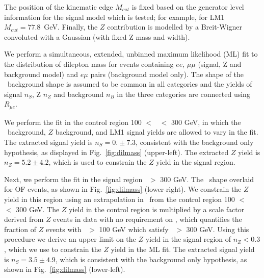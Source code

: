 The position of the kinematic edge $M_{cut}$ is fixed based on the generator level
information for the signal model which is tested; for example, for LM1 
$M_{cut} = 77.8$~GeV. Finally, the $Z$ contribution is modelled by a Breit-Wigner 
convoluted with a Gaussian (with fixed Z mass and width). 

We perform a simultaneous, extended, unbinned maximum 
likelihood (ML) fit to the distribution of dilepton mass for events containing $ee$, $\mu\mu$ 
(signal, Z and background model)
and $e\mu$ pairs (background model only). 
The shape of the \ttbar\ background shape is assumed to be common in all categories
and the yields of signal $n_S$, Z $n_Z$ and background $n_B$ 
in the three categories are connected using $R_{\mu e}$. 

We perform the fit in the control region 100 $<$ \Ht\ $<$ 300 GeV, in
which the \ttbar\ background, $Z$ background, and LM1 signal yields are allowed to vary in the fit. 
The extracted signal yield is $n_S = 0. \pm 7.3$, consistent with the background only 
hypothesis, as displayed in Fig.~\ref{fig:dilmass} (upper-left). 
The extracted $Z$ yield is $n_Z = 5.2 \pm 4.2$, which is 
used to constrain the $Z$ yield in the signal region. 

Next, we perform the fit in the signal region \Ht\ $>$ 300 GeV. The \ttbar\ shape
overlaid for OF events, as shown in Fig.~\ref{fig:dilmass} (lower-right). We
constrain the $Z$ yield in this region using an extrapolation in \Ht\ from the 
control region 100 $<$ \Ht\ $<$ 300 GeV. The $Z$ yield in the control region is
multiplied by a scale factor derived from $Z$ events in data with no requirement
on \MET, which quantifies the fraction of $Z$ events with \Ht\ $>$ 100 GeV which 
satisfy \Ht\ $>$ 300 GeV. Using this procedure we derive an upper limit on the
$Z$ yield in the signal region of $n_Z < 0.3$, which we use to constrain the
$Z$ yield in the ML fit. The extracted signal yield is $n_S = 3.5 \pm 4.9$,
which is consistent with the background only hypothesis,
as shown in Fig.~\ref{fig:dilmass} (lower-left). 
